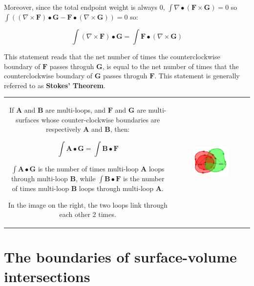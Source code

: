 Moreover, since the total endpoint weight is always \(0\), \(\int \nabla \bullet (\mathbf{F} \times \mathbf{G}) = 0\) so \(\int ((\nabla \times \mathbf{F}) \bullet \mathbf{G} - \mathbf{F} \bullet (\nabla \times \mathbf{G})) = 0\) so:

\begin{thm}\label{thm:stokes_theorem}
\[\int (\nabla \times \mathbf{F}) \bullet \mathbf{G} = \int \mathbf{F} \bullet (\nabla \times \mathbf{G})\]
\end{thm}

This statement reads that the net number of times the counterclockwise boundary of \(\mathbf{F}\) passes throguh \(\mathbf{G}\), is equal to the net number of times that the counterclockwise boundary of \(\mathbf{G}\) passes throguh \(\mathbf{F}\). This statement is generally referred to as {\bf Stokes' Theorem}.

\begin{tabular}{cc}
\parbox{0.5\textwidth}{
If \(\mathbf{A}\) and \(\mathbf{B}\) are multi-loops, and \(\mathbf{F}\) and \(\mathbf{G}\) are multi-surfaces whose counter-clockwise boundaries are respectively \(\mathbf{A}\) and \(\mathbf{B}\), then:

\[\int \mathbf{A} \bullet \mathbf{G} = \int \mathbf{B} \bullet \mathbf{F}\]

\(\int \mathbf{A} \bullet \mathbf{G}\) is the number of times multi-loop \(\mathbf{A}\) loops through multi-loop \(\mathbf{B}\), while \(\int \mathbf{B} \bullet \mathbf{F}\) is the number of times multi-loop \(\mathbf{B}\) loops through multi-loop \(\mathbf{A}\).

In the image on the right, the two loops link through each other \(2\) times. 
} & \parbox{0.5\textwidth}{
\includegraphics[width = 0.5\textwidth]{Boundaries/Path_endpoints/Stokes_theorem}
}
\end{tabular}




\section{The boundaries of surface-volume intersections}

